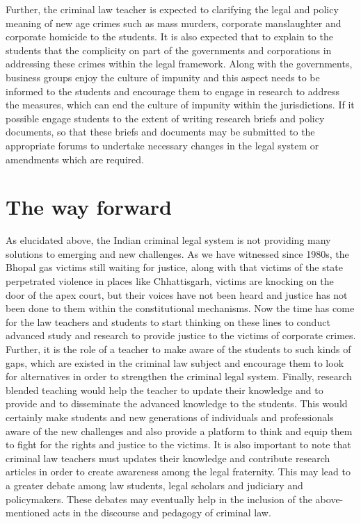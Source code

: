 \begin{multicols}{2}
\noi
Further, the criminal law teacher is expected to clarifying the legal and policy
meaning of new age crimes such as mass murders, corporate manslaughter and
corporate homicide to the students. It is also expected that to explain to the
students that the complicity on part of the governments and corporations in
addressing these crimes within the legal framework. Along with the governments,
business groups enjoy the culture of impunity and this aspect needs to be informed
to the students and encourage them to engage in research to address the measures,
which can end the culture of impunity within the jurisdictions. If it possible engage
students to the extent of writing research briefs and policy documents, so that these
briefs and documents may be submitted to the appropriate forums to undertake
necessary changes in the legal system or amendments which are required.

\vspace{-.3cm}

\section{The way forward}\label{section-4}

\vspace{-.2cm}

\noi
As elucidated above, the Indian criminal legal system is not providing many
solutions to emerging and new challenges. As we have witnessed since 1980s, the
Bhopal gas victims still waiting for justice, along with that victims of the state
perpetrated violence in places like Chhattisgarh, victims are knocking on the door
of the apex court, but their voices have not been heard and justice has not been
done to them within the constitutional mechanisms. Now the time has come for the
law teachers and students to start thinking on these lines to conduct advanced study
and research to provide justice to the victims of corporate crimes. Further, it is the
role of a teacher to make aware of the students to such kinds of gaps, which are
existed in the criminal law subject and encourage them to look for alternatives in
order to strengthen the criminal legal system. Finally, research blended teaching
would help the teacher to update their knowledge and to provide and to
disseminate the advanced knowledge to the students. This would certainly make
students and new generations of individuals and professionals aware of the new
challenges and also provide a platform to think and equip them to fight for the
rights and justice to the victims. It is also important to note that criminal law
teachers must updates their knowledge and contribute research articles in order to
create awareness among the legal fraternity. This may lead to a greater debate
among law students, legal scholars and judiciary and policymakers. These debates
may eventually help in the inclusion of the above-mentioned acts in the discourse
and pedagogy of criminal law.



\end{multicols}
\label{end2018-art2}
